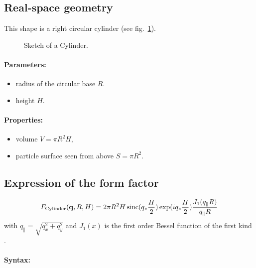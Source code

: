 \subsection{Real-space geometry}
This shape is a right circular cylinder (see fig.~\ref{cylinder}).

\begin{figure}[ht]
\begin{center}
\caption{Sketch of a Cylinder.}
\end{center}
\label{cylinder}
\end{figure}

\paragraph{Parameters:}
\begin{itemize}
\item radius of the circular base $R$. 
\item height $H$.
\end{itemize}

\paragraph{Properties:}
\begin{itemize}
\item volume $V = \pi R^2 H$,
\item particle surface seen from above $S=\pi R^2$.
\end{itemize}

\subsection{Expression of the form factor}
  \begin{equation}
F_{\rm{Cylinder}}(\mathbf{q},R, H)=  2\pi
 R^2 H  \operatorname{sinc}(q_ z \frac{H}{2}) \exp(i q_ z \frac{H}{2}) \frac{J_1(q_{\parallel} R )}{q_{\parallel} R }
 \end{equation}
with $q_{\parallel}=\sqrt{q_x^2+q_y^2}$ and $J_1(x)$ is the first order
Bessel function of the first kind \cite{AbSt64}.

\paragraph{Syntax:} 


